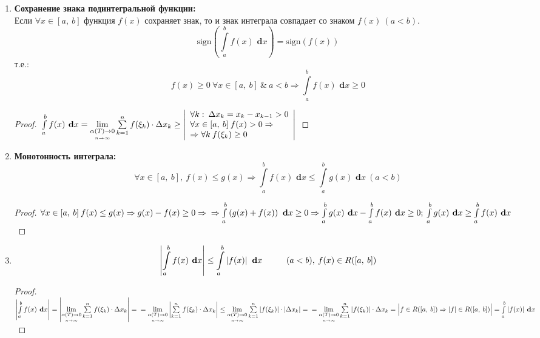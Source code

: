 \documentclass[a4paper,12pt]{bookest}
\theoremstyle{remark}
\newcommand\tab[1][1cm]{\hspace*{#1}}
\newcommand\dx{\textbf{ d}x}
\begin{document}
\begin{enumerate}
\begin{proof}
\begin{itemize}
				\item [b)] пусть, например, $a<b<c\\$Тогда:\\$\int\limits_{a}^{c}f(x)\dx=\int\limits_{a}^{b}f(x)\dx+\int\limits_{b}^{c}f(x)\dx;\\\int\limits_{a}^{b}f(x)\dx=\int\limits_{a}^{c}f(x)\dx-\int\limits_{b}^{c}f(x)\dx=\int\limits_{a}^{c}f(x)\dx+\int\limits_{c}^{b}f(x)\dx$
			\end{itemize}
		\end{proof} 
	\item \textbf{Сохранение знака подинтегральной функции:}\\Если $\forall x\in[a,\>b]$ функция $f(x)$ сохраняет знак, то и знак интеграла совпадает со знаком $f(x)\>(a<b).$ $$\textrm{sign}\left(\int\limits_{a}^{b}f(x)\dx\right)=\textrm{sign}\left(f(x)\right)$$ т.е.: $$f(x)\geq0\>\forall x\in[a,\>b]\>\&\> a<b\Rightarrow\int\limits_{a}^{b}f(x)\dx\geq0$$\begin{proof}
			$\\\int\limits_{a}^{b}f(x)\dx=\lim\limits_{\underset{n\to\infty}{\alpha(T)\to0}}\sum\limits_{k=1}^{n} f(\xi_k)\cdot\Delta x_k\geq \left|\begin{array}{l}
				\forall k:\>\Delta x_k=x_k-x_{k-1}>0\\ \forall x\in[a,\>b]\>f(x)>0\Rightarrow\\\Rightarrow\forall k\>f(\xi_k)\geq0
			\end{array} \right|\\$
		\end{proof}
	\item \textbf{Монотонность интеграла:}
		$$\forall x\in[a,\>b],\>f(x)\leq g(x)\Rightarrow\int\limits_{a}^{b}f(x)\dx\leq\int\limits_{a}^{b}g(x)\dx\>(a<b)$$
		\begin{proof}
				$\forall x\in[a,\>b]\>f(x)\leq g(x)\Rightarrow g(x)-f(x)\geq0\Rightarrow\\\Rightarrow\int\limits_{a}^{b}\left(g(x)+f(x)\right)\dx\geq0\Rightarrow\int\limits_{a}^{b}g(x)\dx-\int\limits_{a}^{b}f(x)\dx\geq0;\>\int\limits_{a}^{b}g(x)\dx\geq\int\limits_{a}^{b}f(x)\dx$
		\end{proof}
	\item $$\left|\int\limits_{a}^{b}f(x)\dx\right|\leq\int\limits_{a}^{b}\left|f(x)\right|\dx\tab (a<b),\>f(x)\in R([a,\>b])$$\begin{proof}
		$\left|\int\limits_{a}^{b}f(x)\dx\right|=\left|\lim\limits_{\underset{n\to\infty}{\alpha(T)\to0}}\sum\limits_{k=1}^{n} f(\xi_k)\cdot\Delta x_k\right|=\\=\lim\limits_{\underset{n\to\infty}{\alpha(T)\to0}}\left|\sum\limits_{k=1}^{n} f(\xi_k)\cdot\Delta x_k\right|\leq\lim\limits_{\underset{n\to\infty}{\alpha(T)\to0}}\sum\limits_{k=1}^{n} \left|f(\xi_k)\right|\cdot|\Delta x_k|=\\=\lim\limits_{\underset{n\to\infty}{\alpha(T)\to0}}\sum\limits_{k=1}^{n}\left|f(\xi_k)\right|\cdot\Delta x_k=\Big|f\in R([a,\>b])\Rightarrow |f|\in R([a,\>b])\Big|=\int\limits_{a}^{b}|f(x)|\dx$

\end{proof}
\end{enumerate}
\end{document}

